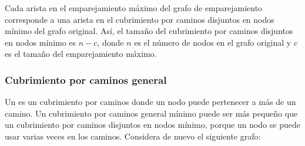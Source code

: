 Cada arista en el emparejamiento máximo del grafo de emparejamiento corresponde
a una arista en el cubrimiento por caminos disjuntos en nodos mínimo
del grafo original.
Así, el tamaño del cubrimiento por caminos disjuntos en nodos mínimo es $n-c$,
donde $n$ es el número de nodos en el grafo original
y $c$ es el tamaño del emparejamiento máximo.

\subsubsection{Cubrimiento por caminos general}

Un  es un cubrimiento por caminos
donde un nodo puede pertenecer a más de un camino.
Un cubrimiento por caminos general mínimo puede ser más pequeño
que un cubrimiento por caminos disjuntos en nodos mínimo,
porque un nodo se puede usar varias veces en los caminos.
Considera de nuevo el siguiente grafo:
\begin{center}
\end{center}

